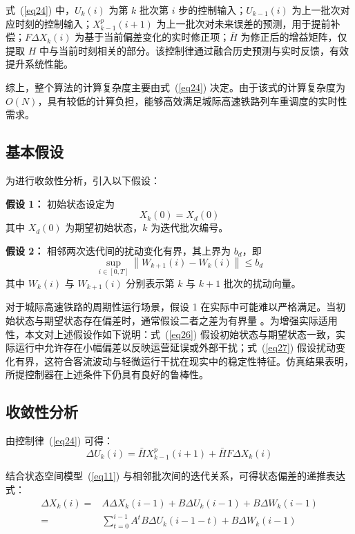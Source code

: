 式~(\ref{eq24}) 中，$U_k(i)$ 为第 $k$ 批次第 $i$ 步的控制输入；$U_{k-1}(i)$ 为上一批次对应时刻的控制输入；$X_{k-1}^p(i+1)$ 为上一批次对未来误差的预测，用于提前补偿；$F \Delta X_k(i)$ 为基于当前偏差变化的实时修正项；$\bar{H}$ 为修正后的增益矩阵，仅提取 $H$ 中与当前时刻相关的部分。该控制律通过融合历史预测与实时反馈，有效提升系统性能。

综上，整个算法的计算复杂度主要由式~(\ref{eq24}) 决定。由于该式的计算复杂度为 $O(N)$，具有较低的计算负担，能够高效满足城际高速铁路列车重调度的实时性需求。

\subsection{基本假设}

为进行收敛性分析，引入以下假设：

\noindent\textbf{假设 1：} 初始状态设定为
\begin{equation}
X_k(0)=X_d(0)
\label{eq26}
\end{equation}
其中 $X_d(0)$ 为期望初始状态，$k$ 为迭代批次编号。

\noindent\textbf{假设 2：} 相邻两次迭代间的扰动变化有界，其上界为 $b_d$，即
\begin{equation}
\sup _{i \in[0, T]}\left\|W_{k+1}(i)-W_k(i)\right\| \leq b_d
\label{eq27}
\end{equation}
其中 $W_k(i)$ 与 $W_{k+1}(i)$ 分别表示第 $k$ 与 $k+1$ 批次的扰动向量。

对于城际高速铁路的周期性运行场景，假设 1 在实际中可能难以严格满足。当初始状态与期望状态存在偏差时，通常假设二者之差为有界量 \cite{Yan2016}。为增强实际适用性，本文对上述假设作如下说明：式~(\ref{eq26}) 假设初始状态与期望状态一致，实际运行中允许存在小幅偏差以反映运营延误或外部干扰；式~(\ref{eq27}) 假设扰动变化有界，这符合客流波动与轻微运行干扰在现实中的稳定性特征。仿真结果表明，所提控制器在上述条件下仍具有良好的鲁棒性。

\subsection{收敛性分析}

由控制律~(\ref{eq24}) 可得：
\begin{equation}
\Delta U_k(i)=\bar{H} X_{k-1}^p(i+1)+\bar{H} F \Delta X_k(i)
\label{eq28}
\end{equation}

结合状态空间模型~(\ref{eq11}) 与相邻批次间的迭代关系，可得状态偏差的递推表达式：
\begin{equation}
\begin{aligned}
\Delta X_k(i) = & A \Delta X_k(i-1) + B \Delta U_k(i-1) + B \Delta W_k(i-1) \\
= & \sum_{t=0}^{i-1} A^t B \Delta U_k(i-1-t) + B \Delta W_k(i-1)
\end{aligned}
\label{eq29}
\end{equation}

